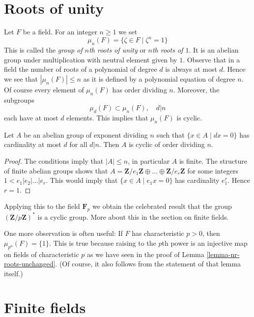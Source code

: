 \section{Roots of unity}
\label{section-roots-of-1}

\noindent
Let $F$ be a field. For an integer $n \geq 1$ we set
$$
\mu_n(F) = \{\zeta \in F \mid \zeta^n = 1\}
$$
This is called the {\it group of $n$th roots of unity} or
{\it $n$th roots of $1$}. It is an abelian group under multiplication
with neutral element given by $1$.
Observe that in a field the number of roots of a polynomial of degree $d$
is always at most $d$. Hence we see that $|\mu_n(F)| \leq n$
as it is defined by a polynomial equation of degree $n$.
Of course every element of $\mu_n(F)$ has order dividing $n$.
Moreover, the subgroups
$$
\mu_d(F) \subset \mu_n(F),\quad d | n
$$
each have at most $d$ elements. This implies that $\mu_n(F)$ is cyclic.

\begin{lemma}
\label{lemma-cyclic}
Let $A$ be an abelian group of exponent dividing $n$ such that
$\{x \in A \mid dx = 0\}$ has cardinality at most $d$ for all $d | n$.
Then $A$ is cyclic of order dividing $n$.
\end{lemma}

\begin{proof}
The conditions imply that $|A| \leq n$, in particular $A$ is finite.
The structure of finite abelian groups shows that
$A = \mathbf{Z}/e_1\mathbf{Z} \oplus \ldots \oplus \mathbf{Z}/e_r\mathbf{Z}$
for some integers $1 < e_1 | e_2 | \ldots | e_r$. This would imply
that $\{x \in A \mid e_1 x = 0\}$ has cardinality $e_1^r$. Hence
$r = 1$.
\end{proof}

\noindent
Applying this to the field $\mathbf{F}_p$ we obtain the celebrated result
that the group $(\mathbf{Z}/p\mathbf{Z})^*$ is a cyclic group. More about
this in the section on finite fields.

\medskip\noindent
One more observation is often useful: If $F$ has characteristic
$p > 0$, then $\mu_{p^n}(F) = \{1\}$. This is true because raising
to the $p$th power is an injective map on fields of characteristic $p$
as we have seen in the proof of Lemma \ref{lemma-nr-roots-unchanged}.
(Of course, it also follows from the statement of that lemma itself.)






\section{Finite fields}
\label{section-finite}


